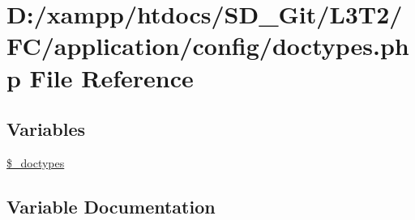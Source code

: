 \hypertarget{doctypes_8php}{}\section{D\+:/xampp/htdocs/\+S\+D\+\_\+\+Git/\+L3\+T2/\+F\+C/application/config/doctypes.php File Reference}
\label{doctypes_8php}
\subsection*{Variables}
\begin{DoxyCompactItemize}
\item 
\hyperlink{doctypes_8php_aae4e5521057605d22a78c29c7d4ad7de}{\$\+\_\+doctypes}
\end{DoxyCompactItemize}


\subsection{Variable Documentation}
\hypertarget{doctypes_8php_aae4e5521057605d22a78c29c7d4ad7de}{}
